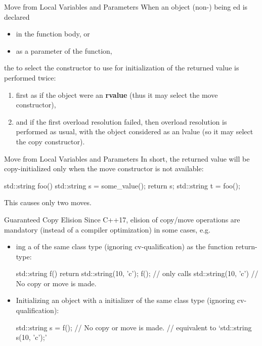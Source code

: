 \documentclass{beamer}
\begin{document}
\begin{frame}{Move from Local Variables and Parameters}
  When an object {\footnotesize(non-)} being ed is declared
  \begin{itemize}
    \item in the function body, or
    \item as a parameter of the function,
  \end{itemize}
  the  to select the constructor to use for initialization of the returned value is performed twice:
  \begin{enumerate}
    \item first as if the object were an \textbf{rvalue} (thus it may select the move constructor),
    \item and if the first overload resolution failed, then overload resolution is performed as usual, with the object considered as an lvalue (so it may select the copy constructor).
  \end{enumerate}
\end{frame}

\begin{frame}[fragile]{Move from Local Variables and Parameters}
  In short, the returned value will be copy-initialized only when the move constructor is not available:
  \begin{cpp}
std::string foo() {
  std::string s = some_value();
  return s;
}
std::string t = foo();
  \end{cpp}
  This causes only two moves.
\end{frame}

\begin{frame}[fragile]{Guaranteed Copy Elision}
  Since C++17, elision of copy/move operations are mandatory (instead of a compiler optimization) in some cases, e.g.
  \begin{itemize}
    \item {}ing a  of the same class type (ignoring cv-qualification) as the function return-type:
    \begin{cpp}
std::string f() {
  return std::string(10, 'c');
}
f(); // only calls std::string(10, 'c')
     // No copy or move is made.
    \end{cpp}
    \item Initializing an object with a  initializer of the same class type (ignoring cv-qualification):
    \begin{cpp}
std::string s = f(); // No copy or move is made.
// equivalent to `std::string s(10, 'c');'
    \end{cpp}
  \end{itemize}
\end{frame}
\end{document}
